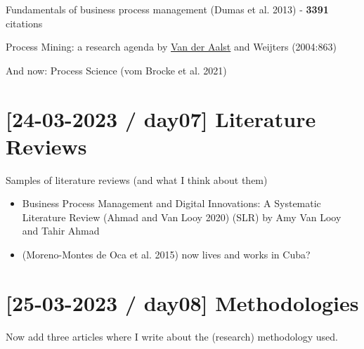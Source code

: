 \documentclass[
  letterpaper,
  DIV=11,
  numbers=noendperiod]{scrreprt}
\begin{document}
\begin{tcolorbox}[enhanced jigsaw, opacityback=0, rightrule=.15mm, colbacktitle=quarto-callout-tip-color!10!white, coltitle=black, leftrule=.75mm, titlerule=0mm, toptitle=1mm, colframe=quarto-callout-tip-color-frame, colback=white, breakable, bottomtitle=1mm, bottomrule=.15mm, arc=.35mm, title=\textcolor{quarto-callout-tip-color}{\faLightbulb}\hspace{0.5em}{\href{https://kodu.ut.ee/~dumas/}{Marlon Dumas, University of Tartu}}, opacitybacktitle=0.6, toprule=.15mm, left=2mm]


Fundamentals of business process management (Dumas et al. 2013) -
\textbf{3391} citations

\end{tcolorbox}

Process Mining: a research agenda by
\href{https://orcid.org/0000-0002-0955-6940}{Van der Aalst} and Weijters
(2004:863)

And now: Process Science (vom Brocke et al. 2021)

\hypertarget{day07-literature-reviews}{%
\section{{[}24-03-2023 / day07{]} Literature
Reviews}\label{day07-literature-reviews}}

Samples of literature reviews (and what I think about them)

\begin{itemize}
\item
  Business Process Management and Digital Innovations: A Systematic
  Literature Review (Ahmad and Van Looy 2020) (SLR) by Amy
  Van Looy and Tahir Ahmad
\item
  (Moreno-Montes de Oca et al. 2015) now lives and works in Cuba?
\end{itemize}

\hypertarget{day08-methodologies}{%
\section{{[}25-03-2023 / day08{]}
Methodologies}\label{day08-methodologies}}

Now add three articles where I write about the (research) methodology
used.
\end{document}

